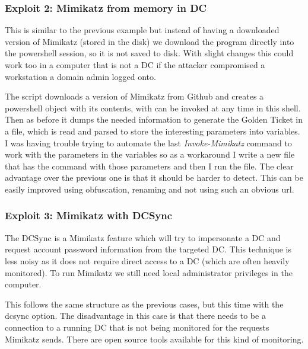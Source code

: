 \subsubsection{Exploit 2: Mimikatz from memory in DC}
This is similar to the previous example but instead of having a downloaded version of Mimikatz (stored in the disk) we download the program directly into the powershell session, so it is not saved to disk.
With slight changes this could work too in a computer that is not a DC if the attacker compromised a workstation a domain admin logged onto\cite{dump_ways}.
\linej

\linej
The script downloads a version of Mimikatz from Github and creates a powershell object with its contents, with can be invoked at any time in this shell\cite{powersploit}\cite{powersploit_2}\cite{mimikatz_details}. Then as before it dumps the needed information to generate the Golden Ticket in a file, which is read and parsed to store the interesting parameters into variables.
\linej
I was having trouble trying to automate the last \textit{Invoke-Mimikatz} command to work with the parameters in the variables so as a workaround I write a new file that has the command with those parameters and then I run the file.
\linej
\linej
The clear advantage over the previous one is that it should be harder to detect. This can be easily improved using obfuscation, renaming and not using such an obvious url.

\subsubsection{Exploit 3: Mimikatz with DCSync}
The DCSync is a Mimikatz feature which will try to impersonate a DC and request account password information from the targeted DC. This technique is less noisy as it does not require direct access to a DC (which are often heavily monitored)\cite{dump_ways}\cite{pentestlab}. To run Mimikatz we still need local administrator privileges in the computer.
\linej

\linej
This follows the same structure as the previous cases, but this time with the dcsync option.
\linej
\linej
The disadvantage in this case is that there needs to be a connection to a running DC that is not being monitored for the requests Mimikatz sends. There are open source tools available for this kind of monitoring\cite{dcsync_monitor}.

